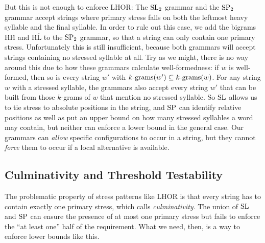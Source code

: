 But this is not enough to enforce LHOR\@:
The $\SL_2$ grammar and the $\SP_2$ grammar accept strings where primary stress falls on both the leftmost heavy syllable and the final syllable.
In order to rule out this case, we add the bigrams \'{H}\'{H} and \'{H}\'{L} to the $\SP_2$ grammar, so that a string can only contain one primary stress.
Unfortunately this is still insufficient, because both grammars will accept strings containing no stressed syllable at all.
Try as we might, there is no way around this due to how these grammars calculate well-formedness: if $w$ is well-formed, then so is every string $w'$ with $\Bigrams[k](w') \subseteq \Bigrams[k](w)$.
For any string $w$ with a stressed syllable, the grammars also accept every string $w'$ that can be built from those $k$-grams of $w$ that mention no stressed syllable.
So $\SL$ allows us to tie stress to absolute positions in the string, and $\SP$ can identify relative positions as well as put an upper bound on how many stressed syllables a word may contain, but neither can enforce a lower bound in the general case.
Our grammars can \emph{allow} specific configurations to occur in a string, but they cannot \emph{force} them to occur if a local alternative is available.

\subsection{Culminativity and Threshold Testability}

The problematic property of stress patterns like LHOR is that every string has to contain exactly one primary stress, which \citet{Heinz14} calls \emph{culminativity}.
The union of $\SL$ and $\SP$ can ensure the presence of at most one primary stress but fails to enforce the ``at least one'' half of the requirement.
What we need, then, is a way to enforce lower bounds like this.

